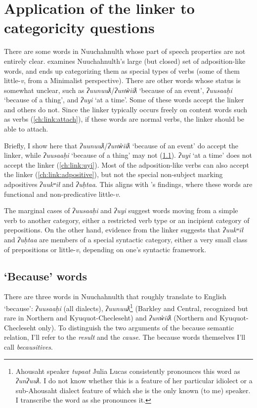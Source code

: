 \section{Application of the linker to categoricity questions} \label{ch:link:application}


There are some words in Nuuchahnulth whose part of speech properties are not entirely clear. \cite{woo2007b} examines Nuuchahnulth's large (but closed) set of adposition-like words, and ends up categorizing them as special types of verbs (some of them little-\textit{v}, from a Minimalist perspective). There are other words whose status is somewhat unclear, such as \textit{ʔuunuuƛ}/\textit{ʔunw̓iiƛ} `because of an event', \textit{ʔuusaaḥi} `because of a thing', and \textit{ʔuyi} `at a time'. Some of these words accept the linker and others do not. Since the linker typically occurs freely on content words such as verbs (\ref{ch:link:attach}), if these words are normal verbs, the linker should be able to attach.

Briefly, I show here that \textit{ʔuunuuƛ}/\textit{ʔunw̓iiƛ} `because of an event' do accept the linker, while \textit{ʔuusaaḥi} `because of a thing' may not (\ref{ch:link:because}). \textit{ʔuyi} `at a time' does not accept the linker (\ref{ch:link:uyi}). Most of the adposition-like verbs can also accept the linker (\ref{ch:link:adpositive}), but not the special non-subject marking adpositives \textit{ʔuukʷił} and \textit{ʔuḥtaa}. This aligns with \citeauthor{woo2007b}'s findings, where these words are functional and non-predicative little-\textit{v}.

The marginal cases of \textit{ʔuusaaḥi} and \textit{ʔuyi} suggest words moving from a simple verb to another category, either a restricted verb type or an incipient category of prepositions. On the other hand, evidence from the linker suggests that \textit{ʔuukʷił} and \textit{ʔuḥtaa} are members of a special syntactic category, either a very small class of prepositions or little-\textit{v}, depending on one's syntactic framework.

\subsection{`Because' words} \label{ch:link:because}

There are three words in Nuuchahnulth that roughly translate to English `because': \textit{ʔuusaaḥi} (all dialects), \textit{ʔuunuuƛ}\footnote{Ahousaht speaker \textit{tupaat} Julia Lucas consistently pronounces this word as \textit{ʔunʔuuƛ}. I do not know whether this is a feature of her particular idiolect or a sub-Ahousaht dialect feature of which she is the only known (to me) speaker. I transcribe the word as she pronounces it.} (Barkley and Central, recognized but rare in Northern and Kyuquot-Checleseht) and \textit{ʔunw̓iiƛ} (Northern and Kyuquot-Checleseht only). To distinguish the two arguments of the because semantic relation, I'll refer to the \textit{result} and the \textit{cause}. The because words themselves I'll call \textit{becausitives}.

